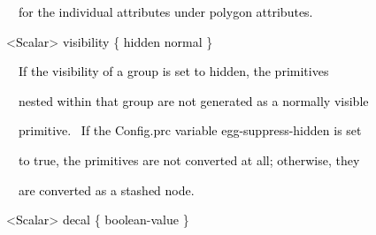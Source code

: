 \documentclass[a4paper]{article}
\newcommand\textstyleOOoComputerKeyWord[1]{\textrm{\textcolor[rgb]{0.0,0.0,0.5019608}{#1}}}
\newcommand\textstyleOOoAssemblerSpecialChar[1]{\textrm{\textcolor[rgb]{0.0,0.5019608,0.0}{#1}}}
\newcommand\textstyleOOoAssemblerIdent[1]{\textrm{\textcolor{black}{#1}}}
\begin{document}
{\color{black}
\textstyleOOoComputerKeyWord{\textcolor{black}{\ \ \ \ for the individual attributes under polygon attributes.}}}


\bigskip

{\color{black}
\textstyleOOoComputerKeyWord{\textcolor{black}{\ \ }}\textstyleOOoAssemblerSpecialChar{{\textless}}\textstyleOOoAssemblerIdent{Scalar}\textstyleOOoAssemblerSpecialChar{{\textgreater}}\textstyleOOoComputerKeyWord{\textcolor{black}{
}}\textstyleOOoAssemblerIdent{visibility}\textstyleOOoComputerKeyWord{\textcolor{black}{
}}\textstyleOOoAssemblerSpecialChar{\{}\textstyleOOoComputerKeyWord{\textcolor{black}{
}}\textstyleOOoAssemblerIdent{hidden}\textstyleOOoComputerKeyWord{\textcolor{black}{
}}\textstyleOOoAssemblerSpecialChar{{\textbar}}\textstyleOOoComputerKeyWord{\textcolor{black}{
}}\textstyleOOoAssemblerIdent{normal}\textstyleOOoComputerKeyWord{\textcolor{black}{
}}\textstyleOOoAssemblerSpecialChar{\}}}


\bigskip

{\color{black}
\textstyleOOoComputerKeyWord{\textcolor{black}{\ \ \ \ If the visibility of a group is set to
{\textquotedbl}hidden{\textquotedbl}, the primitives}}}

{\color{black}
\textstyleOOoComputerKeyWord{\textcolor{black}{\ \ \ \ nested within that group are not generated as a normally
visible}}}

{\color{black}
\textstyleOOoComputerKeyWord{\textcolor{black}{\ \ \ \ primitive. \ If the Config.prc variable egg-suppress-hidden is
set}}}

{\color{black}
\textstyleOOoComputerKeyWord{\textcolor{black}{\ \ \ \ to true, the primitives are not converted at all; otherwise,
they}}}

{\color{black}
\textstyleOOoComputerKeyWord{\textcolor{black}{\ \ \ \ are converted as a {\textquotedbl}stashed{\textquotedbl} node.}}}


\bigskip

{\color{black}
\textstyleOOoComputerKeyWord{\textcolor{black}{\ \ }}\textstyleOOoAssemblerSpecialChar{{\textless}}\textstyleOOoAssemblerIdent{Scalar}\textstyleOOoAssemblerSpecialChar{{\textgreater}}\textstyleOOoComputerKeyWord{\textcolor{black}{
}}\textstyleOOoAssemblerIdent{decal}\textstyleOOoComputerKeyWord{\textcolor{black}{
}}\textstyleOOoAssemblerSpecialChar{\{}\textstyleOOoComputerKeyWord{\textcolor{black}{
}}\textstyleOOoAssemblerIdent{boolean}\textstyleOOoAssemblerSpecialChar{{}-}\textstyleOOoAssemblerIdent{value}\textstyleOOoComputerKeyWord{\textcolor{black}{
}}\textstyleOOoAssemblerSpecialChar{\}}}
\end{document}
